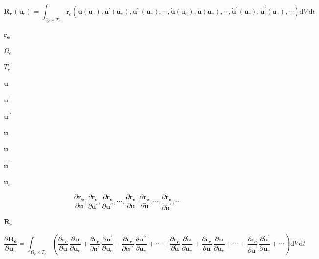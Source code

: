 \documentclass{article}
\begin{document}
\[
\mathbf{R_e} \left( \mathbf{u}_e  \right) = \int_{\Omega_e \times T_e} \mathbf{r}_e \left( 
\mathbf{u} \left( \mathbf{u}_e  \right), \mathbf{u}^{\prime} \left( \mathbf{u}_e  \right), 
\mathbf{u}^{\prime\prime} \left( \mathbf{u}_e  \right), \cdots, 
\mathbf{\dot u} \left( \mathbf{u}_e  \right),\mathbf{\ddot u} \left( \mathbf{u}_e  \right),
\cdots,
\mathbf{\dot u}^{\prime} \left( \mathbf{u}_e  \right), \mathbf{\ddot u}^{\prime} \left( \mathbf{u}_e  \right), \cdots
\right) \mathrm{d} V \, \mathrm{d}t
\]
\pagebreak

$ \mathbf{r_e} $
\pagebreak

$ \Omega_e $
\pagebreak

$ T_e $
\pagebreak

$ \mathbf{u} $
\pagebreak

$ \mathbf{u}^{\prime} $
\pagebreak

$ \mathbf{u}^{\prime\prime} $
\pagebreak

$ \mathbf{\dot u} $
\pagebreak

$ \mathbf{\ddot u}$
\pagebreak

$ \mathbf{\dot u}^{\prime} $
\pagebreak

$ \mathbf{u}_e $
\pagebreak

\[
\frac{\partial  \mathbf{r_e} }{\partial \mathbf{u}}, \frac{\partial  \mathbf{r_e} }{\partial  \mathbf{u}^{\prime}},
\frac{\partial  \mathbf{r_e} }{\partial  \mathbf{u}^{\prime\prime}},
\cdots,  \frac{\partial \mathbf{r_e} }{\partial  \mathbf{\dot u}}, \frac{\partial \mathbf{r_e} }{\partial  \mathbf{\ddot u}},
\cdots, \frac{\partial  \mathbf{r_e} }{\partial  \mathbf{\dot u}^{\prime}}, \cdots
\]
\pagebreak

$ \mathbf{R}_e $
\pagebreak

\[
\frac{\partial  \mathbf{R_e} }{\partial \mathbf{u}_e} = \int_{\Omega_e \times T_e} \left(
\frac{\partial  \mathbf{r_e} }{\partial \mathbf{u}} \, \frac{\partial  \mathbf{u} }{\partial \mathbf{u}_e}
+ \frac{\partial  \mathbf{r_e} }{\partial \mathbf{u}^{\prime}} \, \frac{\partial  \mathbf{u}^{\prime} }{\partial \mathbf{u}_e}
+ \frac{\partial  \mathbf{r_e} }{\partial \mathbf{u}^{\prime\prime}} \, \frac{\partial  \mathbf{u}^{\prime\prime} }{\partial \mathbf{u}_e}
+ \cdots + \frac{\partial  \mathbf{r_e} }{\partial \mathbf{\dot u}} \, \frac{\partial  \mathbf{\dot u}}{\partial \mathbf{u}_e}
+ \frac{\partial  \mathbf{r_e} }{\partial \mathbf{\ddot u}} \, \frac{\partial  \mathbf{\ddot u}}{\partial \mathbf{u}_e}
+ \cdots + \frac{\partial  \mathbf{r_e} }{\partial \mathbf{\dot u}^{\prime}} \, \frac{\partial  \mathbf{\dot u}^{\prime}}{\partial \mathbf{u}_e}
+ \cdots \right) \mathrm{d} V \, \mathrm{d}t
\]
\pagebreak
\end{document}
